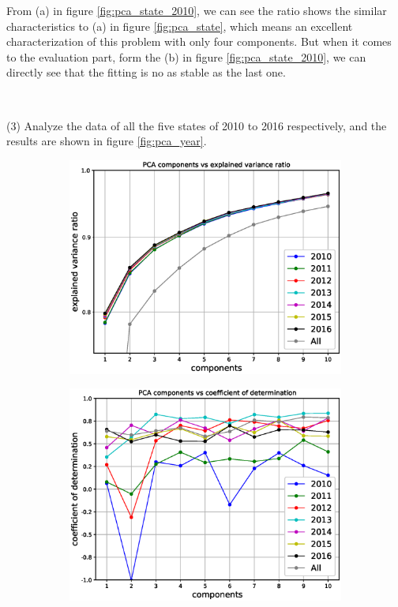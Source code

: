 \documentclass{mcmthesis}
\begin{document}
From (a) in figure \ref{fig:pca_state_2010}, we can see the ratio shows the similar characteristics to (a) in figure \ref{fig:pca_state}, which means an excellent characterization of this problem with only four components. But when it comes to the evaluation part, form the (b) in figure \ref{fig:pca_state_2010}, we can directly see that the fitting is no as stable as the last one.

~\smallskip

(3) Analyze the data of all the five states of 2010 to 2016 respectively, and the results are shown in figure \ref{fig:pca_year}.
    \begin{figure}[H]
    \centering
    \begin{subfigure}[b]{0.49\textwidth}
        \includegraphics[width=\textwidth]{../figure/pca_year_ratio.eps}
        \label{fig:pca_year_ratio}
    \end{subfigure}
    \begin{subfigure}[b]{0.49\textwidth}
        \includegraphics[width=\textwidth]{../figure/pca_year_score.eps}

\end{subfigure}
\end{figure}
\end{document}
